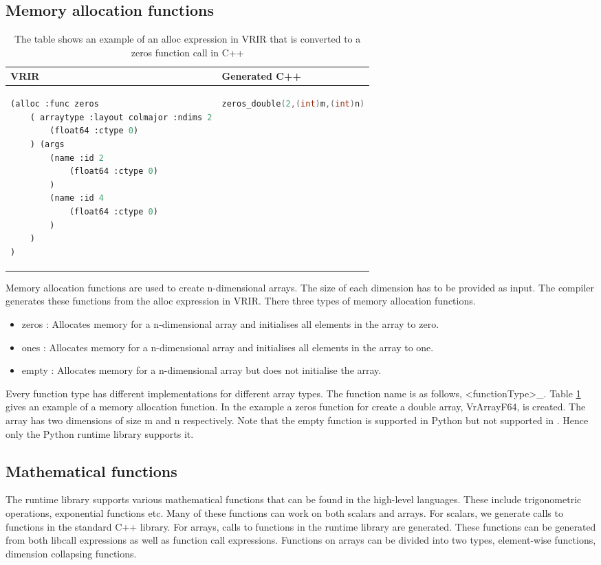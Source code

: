 \subsection{Memory allocation functions}
\begin{table}[htbp]
\centering
\begin{tabular}{|l|l|}
\hline

VRIR &  Generated C++ \\
\hline
{
\begin{lstlisting}[language=lisp,frame=none, numbers=none]
(alloc :func zeros
	( arraytype :layout colmajor :ndims 2
		(float64 :ctype 0)
	) (args
		(name :id 2
			(float64 :ctype 0)
		)
		(name :id 4
			(float64 :ctype 0)
		)
	)
)
\end{lstlisting}
}
&
{
\begin{lstlisting}[language=c,frame=none, numbers=none]
 zeros_double(2,(int)m,(int)n)
\end{lstlisting}
} \\
\hline
\end{tabular}
\caption[Memory allocation example]{The table shows an example of an alloc expression in VRIR that is converted to a zeros function call in C++}
\label{tab:allocFunc}
\end{table}
Memory allocation functions are used to create n-dimensional arrays. The size of each dimension has to be provided as input. The compiler generates these functions from the alloc expression in VRIR. There three types of memory allocation functions. 
\begin{itemize}
\item zeros : Allocates memory for a n-dimensional array and initialises all elements in the array to zero.
\item ones : Allocates memory for a n-dimensional array and initialises all elements in the array to one.
\item empty : Allocates memory for a n-dimensional array but does not initialise the array.
\end{itemize}
Every function type has different implementations for different array types. The function name is as follows, <functionType>\_<array type>. Table \ref{tab:allocFunc} gives an example of a memory allocation function. In the example a zeros function for create a double array, VrArrayF64, is created. The array has two dimensions of size m and n respectively. Note that the empty function is supported in Python but not supported in \matlab. Hence only the Python runtime library supports it.
\subsection{Mathematical functions} 
The runtime library supports various mathematical functions that can be found in the high-level languages. These include trigonometric operations, exponential functions etc. Many of these functions can work on both scalars and arrays. For scalars, we generate calls to functions in the standard C++ library. For arrays, calls to functions in the runtime library are generated. These functions can be generated from both libcall expressions as well as function call expressions.  Functions on arrays can be divided into two types, element-wise functions, dimension collapsing functions. 
